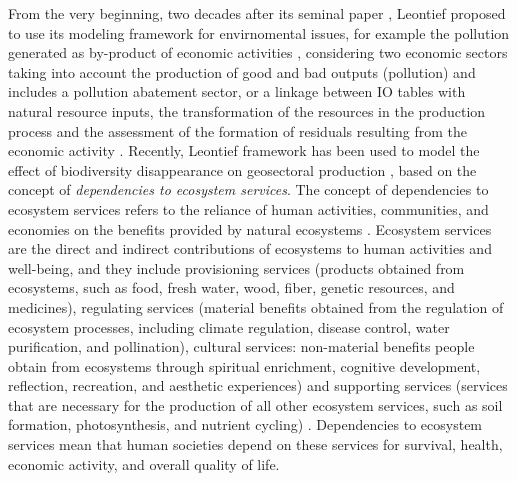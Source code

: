 \documentclass{article}
\begin{document}
From the very beginning, two decades after its seminal paper \cite{leontief1949structural}, Leontief proposed to use its modeling framework for envirnomental issues, for example the pollution generated as by-product of economic activities \cite{leontief1970environmental}, considering two economic sectors taking into account the production of good and bad outputs (pollution) and includes a pollution abatement sector, or a linkage between IO tables with natural resource inputs, the transformation of the resources in the production process and the assessment of the formation of residuals resulting from the economic activity \cite{leontief1973national}.
Recently, Leontief framework has been used to model the effect of biodiversity disappearance on geosectoral production \cite{boldrini2023living}, based on the concept of \textit{dependencies to ecosystem services}. The concept of dependencies to ecosystem services refers to the reliance of human activities, communities, and economies on the benefits provided by natural ecosystems \cite{maes2016mapping}. Ecosystem services are the direct and indirect contributions of ecosystems to human activities and well-being, and they include provisioning services (products obtained from ecosystems, such as food, fresh water, wood, fiber, genetic resources, and medicines), regulating services (material benefits obtained from the regulation of ecosystem processes, including climate regulation, disease control, water purification, and pollination), cultural services: non-material benefits people obtain from ecosystems through spiritual enrichment, cognitive development, reflection, recreation, and aesthetic experiences) and supporting services (services that are necessary for the production of all other ecosystem services, such as soil formation, photosynthesis, and nutrient cycling) \cite{assessment2001millennium}. Dependencies to ecosystem services mean that human societies depend on these services for survival, health, economic activity, and overall quality of life.

\vspace{0.1cm}
\end{document}
